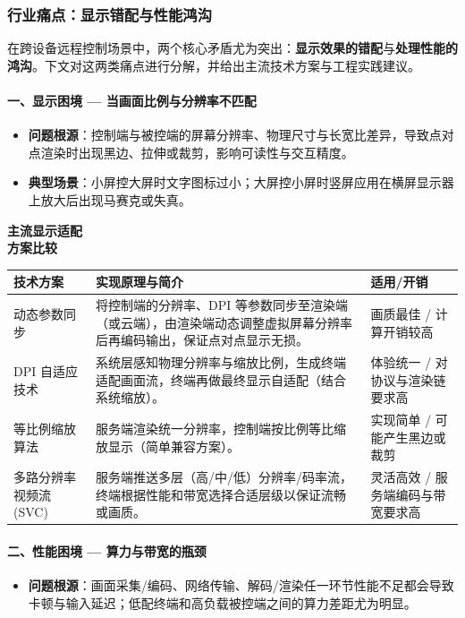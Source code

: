 \documentclass[12pt,a4paper]{article}
\begin{document}
\subsubsection{行业痛点：显示错配与性能鸿沟}

在跨设备远程控制场景中，两个核心矛盾尤为突出：\textbf{显示效果的错配}与\textbf{处理性能的鸿沟}。下文对这两类痛点进行分解，并给出主流技术方案与工程实践建议。

\paragraph{一、显示困境 — 当画面比例与分辨率不匹配}
\begin{itemize}[noitemsep]
  \item \textbf{问题根源}：控制端与被控端的屏幕分辨率、物理尺寸与长宽比差异，导致点对点渲染时出现黑边、拉伸或裁剪，影响可读性与交互精度。
  \item \textbf{典型场景}：小屏控大屏时文字图标过小；大屏控小屏时竖屏应用在横屏显示器上放大后出现马赛克或失真。
\end{itemize}

\noindent\textbf{主流显示适配\\方案比较}\par
\begin{tabular}{>{\raggedright\arraybackslash}p{3.8cm} >{\raggedright\arraybackslash}p{8.2cm} >{\raggedright\arraybackslash}p{3cm}}
\toprule
技术方案 & 实现原理与简介 & 适用/开销 \\
\midrule
动态参数同步 & 将控制端的分辨率、DPI 等参数同步至渲染端（或云端），由渲染端动态调整虚拟屏幕分辨率后再编码输出，保证点对点显示无损。 & 画质最佳 / 计算开销较高 \\
DPI 自适应技术 & 系统层感知物理分辨率与缩放比例，生成终端适配画面流，终端再做最终显示自适配（结合系统缩放）。 & 体验统一 / 对协议与渲染链要求高 \\
等比例缩放算法 & 服务端渲染统一分辨率，控制端按比例等比缩放显示（简单兼容方案）。 & 实现简单 / 可能产生黑边或裁剪 \\
多路分辨率视频流 (SVC) & 服务端推送多层（高/中/低）分辨率/码率流，终端根据性能和带宽选择合适层级以保证流畅或画质。 & 灵活高效 / 服务端编码与带宽要求高 \\
\bottomrule
\end{tabular}

\paragraph{二、性能困境 — 算力与带宽的瓶颈}
\begin{itemize}[noitemsep]
  \item \textbf{问题根源}：画面采集/编码、网络传输、解码/渲染任一环节性能不足都会导致卡顿与输入延迟；低配终端和高负载被控端之间的算力差距尤为明显。
\end{itemize}
\end{document}
